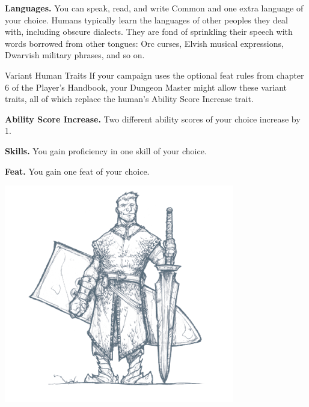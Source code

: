 \textbf{Languages.} You can speak, read, and write Common and one extra language of your choice. Humans typically learn the languages of other peoples they deal with, including obscure dialects. They are fond of sprinkling their speech with words borrowed from other tongues: Orc curses, Elvish musical expressions, Dwarvish military phrases, and so on.

\begin{DndSidebar}[float=!b]{Variant Human Traits}
If your campaign uses the optional feat rules from chapter 6 of the Player’s Handbook, your Dungeon Master might allow these variant traits, all of which replace the human’s Ability Score Increase trait.

\textbf{Ability Score Increase.} Two different ability scores of your choice increase by 1.

\textbf{Skills.} You gain proficiency in one skill of your choice.

\textbf{Feat.} You gain one feat of your choice.
\end{DndSidebar}

\includegraphics{img/races01.png}
